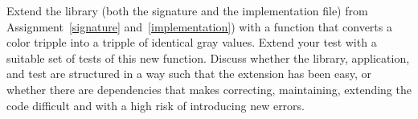 Extend the library (both the signature and the implementation file) from Assignment~\ref{signature} and~\ref{implementation}) with a function that converts a color tripple into a tripple of identical gray values. Extend your test with a suitable set of tests of this new function. Discuss whether the library, application, and test are structured in a way such that the extension has been easy, or whether there are dependencies that makes correcting, maintaining, extending the code difficult and with a high risk of introducing new errors.
